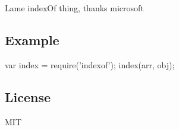Lame index\+Of thing, thanks microsoft

\subsection*{Example}


\begin{DoxyCode}
var index = require('indexof');
index(arr, obj);
\end{DoxyCode}


\subsection*{License}

M\+IT 